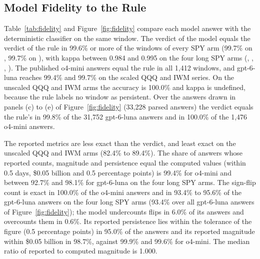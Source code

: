 \subsection{Model Fidelity to the Rule}
\label{sec:results:fidelity}

Table~\ref{tab:fidelity} and Figure~\ref{fig:fidelity} compare each model answer with the deterministic classifier on the same window.
The verdict of the model equals the verdict of the rule in 99.6\% or more of the windows of every SPY arm (99.7\% on , 99.7\% on ), with kappa between 0.984 and 0.995 on the four long SPY arms (, , , ). The published o4-mini answers equal the rule in all 1{,}412 windows, and gpt-6-luna reaches 99.4\% and 99.7\% on the scaled QQQ and IWM series. On the unscaled QQQ and IWM arms the accuracy is 100.0\% and kappa is undefined, because the rule labels no window as persistent. Over the answers drawn in panels (c) to (e) of Figure~\ref{fig:fidelity} (33{,}228 parsed answers) the verdict equals the rule's in 99.8\% of the 31{,}752 gpt-6-luna answers and in 100.0\% of the 1{,}476 o4-mini answers.

The reported metrics are less exact than the verdict, and least exact on the unscaled QQQ and IWM arms (82.4\% to 89.4\%). The share of answers whose reported counts, magnitude and persistence equal the computed values (within 0.5 days, \$0.05 billion and 0.5 percentage points) is 99.4\% for o4-mini and between 92.7\% and 98.1\% for gpt-6-luna on the four long SPY arms. The sign-flip count is exact in 100.0\% of the o4-mini answers and in 93.4\% to 95.6\% of the gpt-6-luna answers on the four long SPY arms (93.4\% over all gpt-6-luna answers of Figure~\ref{fig:fidelity}); the model undercounts flips in 6.0\% of its answers and overcounts them in 0.6\%. Its reported persistence lies within the tolerance of the figure (0.5 percentage points) in 95.0\% of the answers and its reported magnitude within \$0.05 billion in 98.7\%, against 99.9\% and 99.6\% for o4-mini. The median ratio of reported to computed magnitude is 1.000.

